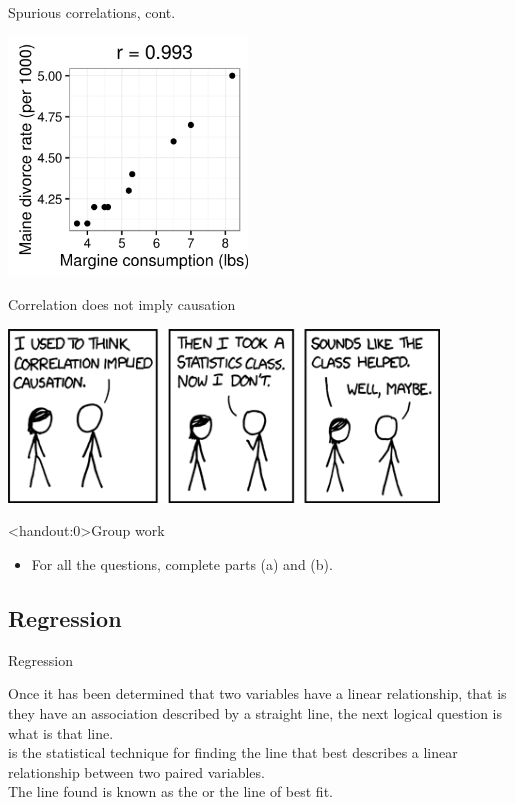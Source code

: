 \documentclass[xcolor=table]{beamer}
\begin{document}
\begin{frame}{Spurious correlations, cont.}
\bigskip
{\centering
\includegraphics[width=2.5in]{../images/ch10_cor_spur2}
\par}

\end{frame}


\begin{frame}{Correlation does not imply causation}

{\centering
\includegraphics[width=4.5in]{../images/ch10_correlation}
\par}
\end{frame}

\begin{frame}<handout:0>{Group work}
\begin{block}{}
\large
\begin{itemize}
\item For all the questions, complete parts (a) and (b).
\end{itemize}
\end{block}
\end{frame}


\subsection{Regression}

\begin{frame}{Regression}
\begin{block}{}
\large
Once it has been determined that two variables have a linear relationship, that is they have an association described by a straight line, the next logical question is what is that line.\\
\pause\medskip
{} is the statistical technique for finding the line that best describes a linear relationship between two paired variables.\\
\pause\medskip
The line found is known as the  or the line of best fit.
\end{block}
\end{frame}
\end{document}
